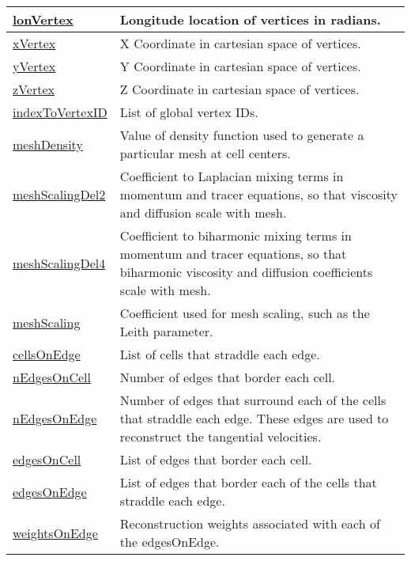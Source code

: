 {\begin{center}
\begin{longtable}{| p{2.0in} | p{4.0in} |}
    \hline
    \hyperref[subsec:var_sec_mesh_lonVertex]{lonVertex} & Longitude location of vertices in radians. \\
    \hline
    \hyperref[subsec:var_sec_mesh_xVertex]{xVertex} & X Coordinate in cartesian space of vertices. \\
    \hline
    \hyperref[subsec:var_sec_mesh_yVertex]{yVertex} & Y Coordinate in cartesian space of vertices. \\
    \hline
    \hyperref[subsec:var_sec_mesh_zVertex]{zVertex} & Z Coordinate in cartesian space of vertices. \\
    \hline
    \hyperref[subsec:var_sec_mesh_indexToVertexID]{indexToVertexID} & List of global vertex IDs. \\
    \hline
    \hyperref[subsec:var_sec_mesh_meshDensity]{meshDensity} & Value of density function used to generate a particular mesh at cell centers. \\
    \hline
    \hyperref[subsec:var_sec_mesh_meshScalingDel2]{meshScalingDel2} & Coefficient to Laplacian mixing terms in momentum and tracer equations, so that viscosity and diffusion scale with mesh. \\
    \hline
    \hyperref[subsec:var_sec_mesh_meshScalingDel4]{meshScalingDel4} & Coefficient to biharmonic mixing terms in momentum and tracer equations, so that biharmonic viscosity and diffusion coefficients scale with mesh. \\
    \hline
    \hyperref[subsec:var_sec_mesh_meshScaling]{meshScaling} & Coefficient used for mesh scaling, such as the Leith parameter. \\
    \hline
    \hyperref[subsec:var_sec_mesh_cellsOnEdge]{cellsOnEdge} & List of cells that straddle each edge. \\
    \hline
    \hyperref[subsec:var_sec_mesh_nEdgesOnCell]{nEdgesOnCell} & Number of edges that border each cell. \\
    \hline
    \hyperref[subsec:var_sec_mesh_nEdgesOnEdge]{nEdgesOnEdge} & Number of edges that surround each of the cells that straddle each edge. These edges are used to reconstruct the tangential velocities. \\
    \hline
    \hyperref[subsec:var_sec_mesh_edgesOnCell]{edgesOnCell} & List of edges that border each cell. \\
    \hline
    \hyperref[subsec:var_sec_mesh_edgesOnEdge]{edgesOnEdge} & List of edges that border each of the cells that straddle each edge. \\
    \hline
    \hyperref[subsec:var_sec_mesh_weightsOnEdge]{weightsOnEdge} & Reconstruction weights associated with each of the edgesOnEdge. \\

\end{longtable}
\end{center}}
